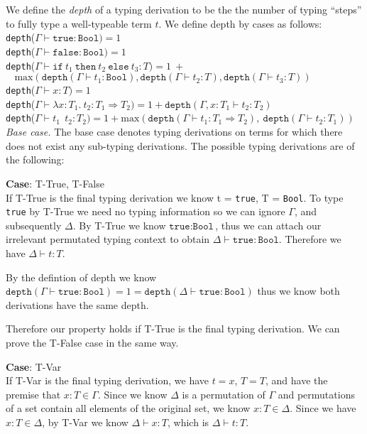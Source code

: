 \documentclass[12pt, fleqn]{article}
\begin{document}
\medskip
We define the \emph{depth} of a typing derivation to be the the number of typing ``steps'' to fully type a 
well-typeable term $t$. We define depth by cases as follows:\\
\texttt{depth}($\Gamma \vdash \texttt{true} : \texttt{Bool}) = 1$\\
\texttt{depth}($\Gamma \vdash \texttt{false} : \texttt{Bool}) = 1$\\
\texttt{depth}($\Gamma \vdash \texttt{if}\:t_1\:\texttt{then}\:t_2\:\texttt{else}\:t_3 : T) = 1 ~+$\\
    $~~~~\textrm{max}(\texttt{depth}(\Gamma \vdash t_1 : \texttt{Bool}),
    \texttt{depth}(\Gamma \vdash t_2 : T),
    \texttt{depth}(\Gamma \vdash t_3 : T))$\\
\texttt{depth}($\Gamma \vdash x : T) = 1$\\
\texttt{depth}($\Gamma \vdash \lambda x : T_1 . \: t_2 : T_1 \Rightarrow T_2) =  1 + 
    \texttt{depth}(\Gamma, x: T_1 \vdash t_2: T_2)$\\
\texttt{depth}($\Gamma \vdash t_1\:\:t_2 : T_2) = 1 + \textrm{max}(
    \texttt{depth}(\Gamma \vdash t_1 : T_1 \Rightarrow T_2),~
    \texttt{depth}(\Gamma \vdash t_2 : T_1))$\\

\medskip
\emph{Base case.} The base case denotes typing derivations on terms for which there does not exist any sub-typing derivations.
The possible typing derivations are of the following:

\medskip
\textbf{Case}: T-True, T-False\\
If T-True is the final typing derivation we know t = \texttt{true}, T = \texttt{Bool}. To type \texttt{true} by
T-True we need no typing information so we can ignore $\Gamma$, and subsequently $\Delta$.
By T-True we know $\texttt{true} : \texttt{Bool}$, thus we can attach our irrelevant permutated typing context to obtain
$\Delta \vdash \texttt{true}: \texttt{Bool}$. Therefore we have $\Delta \vdash t : T$.

By the defintion of depth we know $\texttt{depth}(\Gamma \vdash \texttt{true} : \texttt{Bool}) = 1 = 
\texttt{depth}(\Delta \vdash \texttt{true} : \texttt{Bool})$ thus we know both derivations have the same depth.

Therefore our property holds if T-True is the final typing derivation.
We can prove the T-False case in the same way.

\medskip
\textbf{Case}: T-Var\\
If T-Var is the final typing derivation, we have $t = x$, $T = T$, and have the premise that $x : T \in \Gamma$. Since we know $\Delta$ is
a permutation of $\Gamma$ and permutations of a set contain all elements of the original set, we know $x : T \in \Delta$. Since we have 
$x : T \in \Delta$, by T-Var we know $\Delta \vdash x : T$, which is $\Delta \vdash t: T$. 
\end{document}
